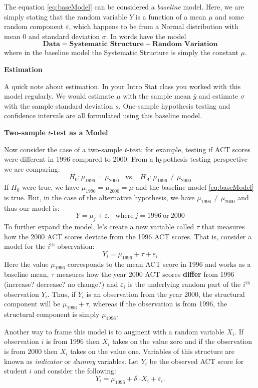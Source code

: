 \documentclass[
]{book}
\begin{document}
The equation \eqref{eq:baseModel} can be considered a \emph{baseline} model.
Here, we are simply stating that the random variable \(Y\) is a function of a mean \(\mu\) and some random component \(\varepsilon\), which happens to be from a Normal distribution with mean 0 and standard deviation \(\sigma\).
In words have the model
\[\textbf{Data} = \textbf{Systematic Structure} + \textbf{Random Variation}\]
where in the baseline model the Systematic Structure is simply the constant \(\mu\).

\textbf{Estimation}

A quick note about estimation.
In your Intro Stat class you worked with this model regularly.
We would estimate \(\mu\) with the sample mean \(\bar{y}\) and estimate \(\sigma\) with the sample standard deviation \(s\).
One-sample hypothesis testing and confidence intervals are all formulated using this baseline model.

\textbf{Two-sample \(t\)-test as a Model}

Now consider the case of a two-sample \(t\)-test; for example, testing if ACT scores were different in 1996 compared to 2000.
From a hypothesis testing perspective we are comparing:
\[H_0: \mu_{1996} = \mu_{2000}~~~~\text{vs.}~~~~H_A: \mu_{1996} \neq \mu_{2000}\]
If \(H_0\) were true, we have \(\mu_{1996}=\mu_{2000}=\mu\) and the baseline model \eqref{eq:baseModel} is true.
But, in the case of the alternative hypothesis, we have \(\mu_{1996} \neq \mu_{2000}\) and thus our model is:
\[Y = \mu_j + \varepsilon, ~~~\text{where}~j=1996~\text{or}~2000\]
To further expand the model, le's create a new variable called \(\tau\) that measures how the 2000 ACT scores deviate from the 1996 ACT scores.
That is, consider a model for the \(i^\mathrm{th}\) observation:
\[Y_i = \mu_{1996} + \tau + \varepsilon_i\]
Here the value \(\mu_{1996}\) corresponds to the mean ACT score in 1996 and works as a baseline mean, \(\tau\) measures how the year 2000 ACT scores \textbf{differ} from 1996 (increase? decrease? no change?) and \(\varepsilon_i\) is the underlying random part of the \(i^\mathrm{th}\) observation \(Y_i\). Thus, if \(Y_i\) is an observation from the year 2000, the structural component will be \(\mu_{1996}+\tau\), whereas if the observation is from 1996, the structural component is simply \(\mu_{1996}\).

Another way to frame this model is to augment with a random variable \(X_i\). If observation \(i\) is from 1996 then \(X_i\) takes on the value zero and if the observation is from 2000 then \(X_i\) takes on the value one. Variables of this structure are known as \emph{indicator} or \emph{dummy} variables. Let \(Y_i\) be the observed ACT score for student \(i\) and consider the following:
\begin{equation}
Y_i = \mu_{1996} + \delta\cdot X_i + \varepsilon_i.
\label{eq:twoSampleTtest}
\end{equation}
\end{document}
